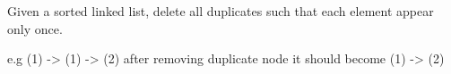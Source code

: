 Given a sorted linked list, delete all duplicates such that each element appear only
once. 

e.g 
(1) -> (1) -> (2)
after removing duplicate node it should become
(1) -> (2)